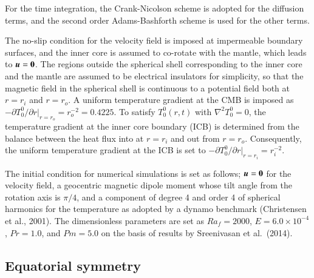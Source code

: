 For the time integration, the Crank-Nicolson scheme is adopted for the diffusion terms, and the second order Adams-Bashforth scheme is used for the other terms.

The no-slip condition for the velocity field is imposed at impermeable boundary surfaces, and the inner core is assumed to co-rotate with the mantle, which leads to $\mbox{\boldmath$u$} = {\bf 0}$.
The regions outside the spherical shell corresponding to the inner core and the mantle are assumed to be electrical insulators for simplicity, so that the magnetic field in the spherical shell is continuous to a potential field both at $r = r_i$ and $r = r_o$.
{\color{red}
A
}
uniform temperature gradient at the CMB is imposed as $-\partial T_0^0 / \partial r |_{r = r_o} = r_{o}^{-2} = 0.4225$. 
To satisfy $T_0^0 (r, t)$ with $\nabla^2 T_0^0 = 0$,
the temperature gradient at the inner core boundary (ICB) is determined from the balance between the heat flux into at $r = r_i$ and out from $r = r_o$. 
Consequently, the uniform temperature gradient at the ICB is set to $-\partial T_0^0 / \partial r |_{r = r_i} = r_i^{-2}$.

The initial condition for numerical simulations is set as follows; $\mbox{\boldmath$u$} = {\bf 0}$ for the velocity field, a geocentric magnetic dipole moment whose tilt angle from the rotation axis is $\pi / 4$, and a component of degree 4 and order 4 of spherical harmonics for the temperature as adopted by a dynamo benchmark (Christensen et al., 2001).
{\color{teal}
The dimensionless parameters are set as $Ra_f = 2000$, $E = 6.0 \times 10^{-4}$, $Pr = 1.0$, and $Pm = 5.0$ on the basis of results by Sreenivasan et al.\ (2014).
}

\subsection{Equatorial symmetry}

